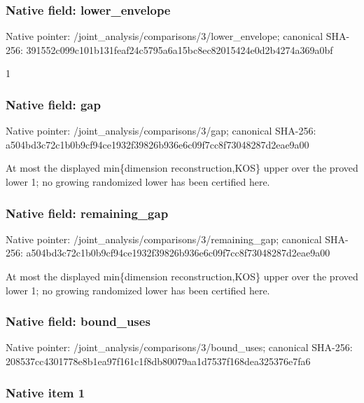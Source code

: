 \documentclass[10pt,a4paper]{article}
\begin{document}
\subsubsection{Native field: lower\_envelope}


Native pointer: /joint\_analysis/comparis\allowbreak{}ons/3/lower\_envelope; canonical SHA-256: 391552c099c101b131feaf24\allowbreak{}c5795a6a15bc8ec82015424e\allowbreak{}0d2b4274a369a0bf


1


\subsubsection{Native field: gap}


Native pointer: /joint\_analysis/comparisons/3/gap; canonical SHA-256: a504bd3c72c1b0b9cf94ce19\allowbreak{}32f39826b936e6c09f7cc8f7\allowbreak{}3048287d2eae9a00


At most the displayed min\{dimension reconstruction,KOS\} upper over the proved lower 1; no growing randomized lower has been certified here.


\subsubsection{Native field: remaining\_gap}


Native pointer: /joint\_analysis/comparis\allowbreak{}ons/3/remaining\_gap; canonical SHA-256: a504bd3c72c1b0b9cf94ce19\allowbreak{}32f39826b936e6c09f7cc8f7\allowbreak{}3048287d2eae9a00


At most the displayed min\{dimension reconstruction,KOS\} upper over the proved lower 1; no growing randomized lower has been certified here.


\subsubsection{Native field: bound\_uses}


Native pointer: /joint\_analysis/comparis\allowbreak{}ons/3/bound\_uses; canonical SHA-256: 208537cc4301778e8b1ea97f\allowbreak{}161c1f8db80079aa1d7537f1\allowbreak{}68dea325376e7fa6



\subsubsection{Native item 1}
\end{document}
